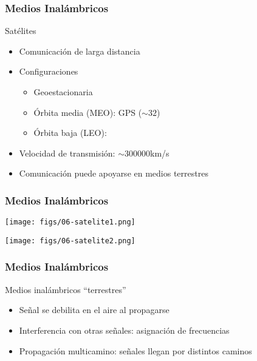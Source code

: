 \documentclass[letter]{beamer}
\begin{document}
\begin{frame}
  \frametitle{Medios Inalámbricos}

  Satélites
  
  \begin{itemize}
    \item Comunicación de larga distancia
    \item Configuraciones
      \begin{itemize}
        \item Geoestacionaria
        \item Órbita media (MEO): GPS ($\sim 32$)
        \item Órbita baja (LEO):  
      \end{itemize}
    \item Velocidad de transmisión: $\sim 300000$km/s
    \item Comunicación puede apoyarse en medios terrestres
  \end{itemize}

\end{frame}
\begin{frame}
  \frametitle{Medios Inalámbricos}

  \begin{center}
    \texttt{[image: figs/06-satelite1.png]}
  \end{center}

  \begin{center}
    \texttt{[image: figs/06-satelite2.png]}
  \end{center}
  

\end{frame}
\begin{frame}
  \frametitle{Medios Inalámbricos}

  Medios inalámbricos ``terrestres''
  \begin{itemize}
    \item Señal se debilita en el aire al propagarse
    \item Interferencia con otras señales: asignación de frecuencias
    \item Propagación multicamino: señales llegan por distintos caminos
  \end{itemize}

\end{frame}
\end{document}
